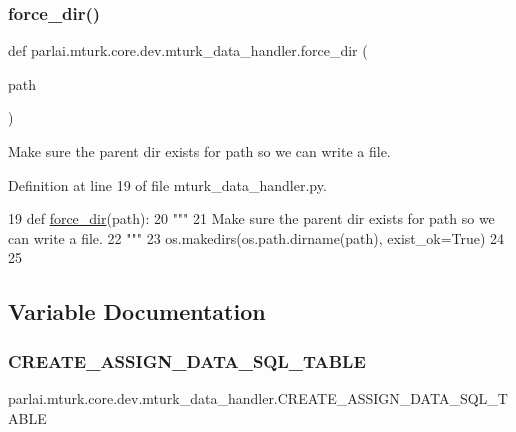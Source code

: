 \subsubsection{\texorpdfstring{force\+\_\+dir()}{force\_dir()}}
{\footnotesize\ttfamily def parlai.\+mturk.\+core.\+dev.\+mturk\+\_\+data\+\_\+handler.\+force\+\_\+dir (\begin{DoxyParamCaption}\item[{}]{path }\end{DoxyParamCaption})}

\begin{DoxyVerb}Make sure the parent dir exists for path so we can write a file.
\end{DoxyVerb}
 

Definition at line 19 of file mturk\+\_\+data\+\_\+handler.\+py.


\begin{DoxyCode}
19 \textcolor{keyword}{def }\hyperlink{namespaceparlai_1_1mturk_1_1core_1_1mturk__data__handler_a28ec50366a486cded72d95c9be461c2f}{force\_dir}(path):
20     \textcolor{stringliteral}{"""}
21 \textcolor{stringliteral}{    Make sure the parent dir exists for path so we can write a file.}
22 \textcolor{stringliteral}{    """}
23     os.makedirs(os.path.dirname(path), exist\_ok=\textcolor{keyword}{True})
24 
25 
\end{DoxyCode}


\subsection{Variable Documentation}
\mbox{\label{namespaceparlai_1_1mturk_1_1core_1_1dev_1_1mturk__data__handler_a0f33a1fdb2e1f3307d6541af70cb9290}} 
\subsubsection{\texorpdfstring{C\+R\+E\+A\+T\+E\+\_\+\+A\+S\+S\+I\+G\+N\+\_\+\+D\+A\+T\+A\+\_\+\+S\+Q\+L\+\_\+\+T\+A\+B\+LE}{CREATE\_ASSIGN\_DATA\_SQL\_TABLE}}
{\footnotesize\ttfamily parlai.\+mturk.\+core.\+dev.\+mturk\+\_\+data\+\_\+handler.\+C\+R\+E\+A\+T\+E\+\_\+\+A\+S\+S\+I\+G\+N\+\_\+\+D\+A\+T\+A\+\_\+\+S\+Q\+L\+\_\+\+T\+A\+B\+LE}



